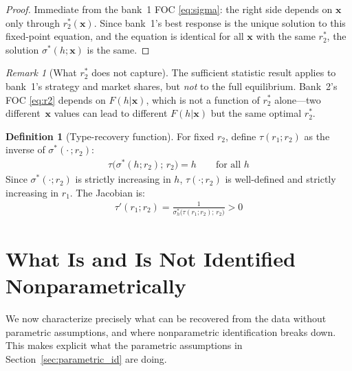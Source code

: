 \documentclass[12pt]{article}
\theoremstyle{plain}
\theoremstyle{plain}
\theoremstyle{definition}  %
\newtheorem{definition}[thm]{Definition}  %
\theoremstyle{remark}  %
\newtheorem{remark}[thm]{Remark}  %
\begin{document}
\begin{proof}
Immediate from the bank~1 FOC \eqref{eq:sigma}: the right side depends on $\mathbf{x}$ only through $r_2^*(\mathbf{x})$. Since bank~1's best response is the unique solution to this fixed-point equation, and the equation is identical for all $\mathbf{x}$ with the same $r_2^*$, the solution $\sigma^*(h; \mathbf{x})$ is the same.
\end{proof}

\begin{remark}[What $r_2^*$ does not capture]\label{rem:suffstat_limit}
The sufficient statistic result applies to bank~1's strategy and market shares, but \emph{not} to the full equilibrium. Bank~2's FOC \eqref{eq:r2} depends on $F(h|\mathbf{x})$, which is not a function of $r_2^*$ alone---two different~$\mathbf{x}$ values can lead to different $F(h|\mathbf{x})$ but the same optimal $r_2^*$.
\end{remark}

\begin{definition}[Type-recovery function]\label{def:tau}
For fixed $r_2$, define $\tau(r_1; r_2)$ as the inverse of $\sigma^*(\cdot\,; r_2)$:
\begin{align}\label{eq:tau_def}
    \tau\!\big(\sigma^*(h; r_2);\, r_2\big) = h \qquad \text{for all } h
\end{align}
Since $\sigma^*(\cdot; r_2)$ is strictly increasing in $h$, $\tau(\cdot; r_2)$ is well-defined and strictly increasing in $r_1$.  The Jacobian is:
\begin{align}\label{eq:tau_prime}
    \tau'(r_1; r_2) = \frac{1}{\sigma^*_h\!\big(\tau(r_1;r_2);\, r_2\big)} > 0
\end{align}
\end{definition}



\newpage
\section{What Is and Is Not Identified Nonparametrically}\label{sec:nonpar_id}

We now characterize precisely what can be recovered from the data without parametric assumptions, and where nonparametric identification breaks down. This makes explicit what the parametric assumptions in Section~\ref{sec:parametric_id} are doing.
\end{document}
